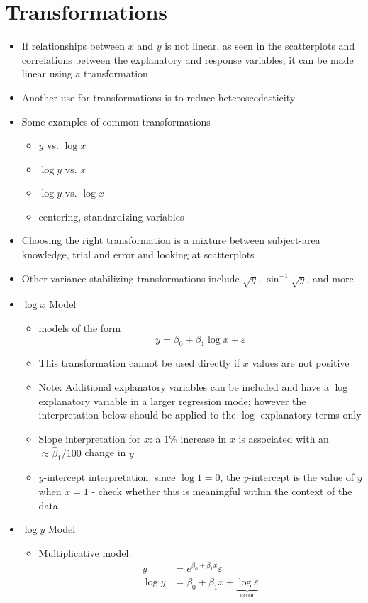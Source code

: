 \documentclass[12pt]{article}
\begin{document}
\section{Transformations}
\begin{itemize}
\item If relationships between $x$ and $y$ is not linear, as seen in the scatterplots and correlations between the explanatory and response variables, it can be made linear using a transformation
\item Another use for transformations is to reduce heteroscedasticity 
\item Some examples of common transformations \begin{itemize} 
\item $y$ vs. $\log x$ 
\item $\log y$ vs. $x$
\item $\log y$ vs. $\log x$
\item centering, standardizing variables \end{itemize} 
\item Choosing the right transformation is a mixture between subject-area knowledge, trial and error and looking at scatterplots 
\item Other variance stabilizing transformations include $\sqrt{y}$, $\sin^{-1} \sqrt{y}$, and more
\item $\log x$ Model \begin{itemize} 
\item models of the form $$ y = \beta_0 + \beta_1\log x + \varepsilon$$ 
\item This transformation cannot be used directly if $x$ values are not positive 
\item Note: Additional explanatory variables can be included and have a $\log$ explanatory variable in a larger regression mode; however the interpretation below should be applied to the $\log$ explanatory terms only
\item Slope interpretation for $x$: a $1\%$ increase in $x$ is associated with an $\approx \hat{\beta}_1 / 100$ change in $y$
\item $y$-intercept interpretation: since $\log 1 = 0$, the $y$-intercept is the value of $y$ when $x = 1$ - check whether this is meaningful within the context of the data \end{itemize} 
\item $\log y$ Model \begin{itemize} 
\item Multiplicative model: $$ \begin{aligned} y &= e^{\beta_0 + \beta_1x}\varepsilon \\ \log y &= \beta_0 + \beta_1x + \underbrace{\log \varepsilon}_{\text{error}} \end{aligned} $$ 

\end{itemize}
\end{itemize}
\end{document}
